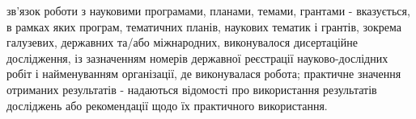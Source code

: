 зв’язок роботи з науковими програмами, планами, темами, грантами - вказується, в рамках яких програм, тематичних планів, наукових тематик і грантів, зокрема галузевих, державних та/або міжнародних, виконувалося дисертаційне дослідження, із зазначенням номерів державної реєстрації науково-дослідних робіт і найменуванням організації, де виконувалася робота;
практичне значення отриманих результатів - надаються відомості про використання результатів досліджень або рекомендації щодо їх практичного використання.


